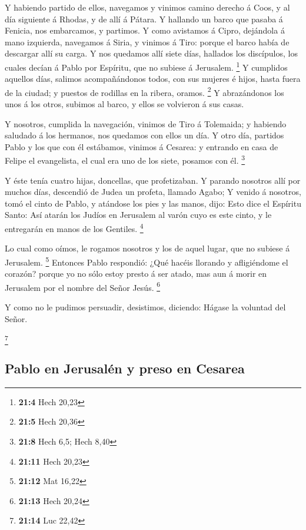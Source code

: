  Y habiendo partido de ellos, navegamos y vinimos camino
derecho á Coos, y al día siguiente á Rhodas, y de allí á Pátara.
 Y hallando un barco que pasaba á Fenicia, nos embarcamos,
y partimos.  Y como avistamos á Cipro, dejándola á mano
izquierda, navegamos á Siria, y vinimos á Tiro: porque el barco había de
descargar allí su carga.  Y nos quedamos allí siete días,
hallados los discípulos, los cuales decían á Pablo por Espíritu, que no
subiese á Jerusalem. \footnote{\textbf{21:4} Hech 20,23} 
Y cumplidos aquellos días, salimos acompañándonos todos, con sus mujeres
é hijos, hasta fuera de la ciudad; y puestos de rodillas en la ribera,
oramos. \footnote{\textbf{21:5} Hech 20,36}  Y
abrazándonos los unos á los otros, subimos al barco, y ellos se
volvieron á sus casas.

 Y nosotros, cumplida la navegación, vinimos de Tiro á
Tolemaida; y habiendo saludado á los hermanos, nos quedamos con ellos un
día.  Y otro día, partidos Pablo y los que con él
estábamos, vinimos á Cesarea: y entrando en casa de Felipe el
evangelista, el cual era uno de los siete, posamos con él. \footnote{\textbf{21:8}
  Hech 6,5; Hech 8,40}

 Y éste tenía cuatro hijas, doncellas, que profetizaban.
 Y parando nosotros allí por muchos días, descendió de
Judea un profeta, llamado Agabo;  Y venido á nosotros,
tomó el cinto de Pablo, y atándose los pies y las manos, dijo: Esto dice
el Espíritu Santo: Así atarán los Judíos en Jerusalem al varón cuyo es
este cinto, y le entregarán en manos de los Gentiles. \footnote{\textbf{21:11}
  Hech 20,23}

 Lo cual como oímos, le rogamos nosotros y los de aquel
lugar, que no subiese á Jerusalem. \footnote{\textbf{21:12} Mat 16,22}
 Entonces Pablo respondió: ¿Qué hacéis llorando y
afligiéndome el corazón? porque yo no sólo estoy presto á ser atado, mas
aun á morir en Jerusalem por el nombre del Señor Jesús. \footnote{\textbf{21:13}
  Hech 20,24}

 Y como no le pudimos persuadir, desistimos, diciendo:
Hágase la voluntad del Señor.

\footnote{\textbf{21:14} Luc 22,42}

\hypertarget{pablo-en-jerusaluxe9n-y-preso-en-cesarea}{%
\subsection{Pablo en Jerusalén y preso en
Cesarea}\label{pablo-en-jerusaluxe9n-y-preso-en-cesarea}}


